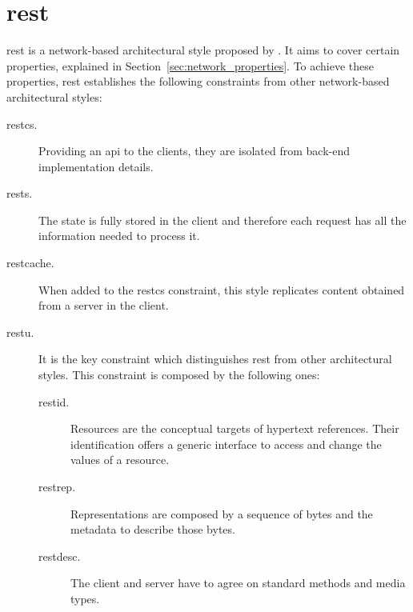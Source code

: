 \section{\acl{rest}}
\label{sec:rest}

\acf{rest} is a network-based architectural style proposed by \citet{fielding_architectural_2000}.
It aims to cover certain properties, explained in Section~\ref{sec:network_properties}.
To achieve these properties, \ac{rest} establishes the following constraints from other network-based architectural styles:
\begin{description}
 \item[\acf{restcs}.] Providing an \ac{api} to the clients, they are isolated from back-end implementation details.
 \item[\acf{rests}.] The state is fully stored in the client and therefore each request has all the information needed to process it.
 \item[\acf{restcache}.] When added to the \ac{restcs} constraint, this style replicates content obtained from a server in the client.
 \item[\acf{restu}.] It is the key constraint which distinguishes \ac{rest} from other architectural styles.
                      This constraint is composed by the following ones:
    \begin{description}
	\item[\acf{restid}.] Resources are the conceptual targets of hypertext references.
			      Their identification offers a generic interface to access and change the values of a resource.
	\item[\acf{restrep}.] Representations are composed by a sequence of bytes and the metadata to describe those bytes.
	\item[\acf{restdesc}.] The client and server have to agree on standard methods and media types. %

\end{description}
\end{description}
